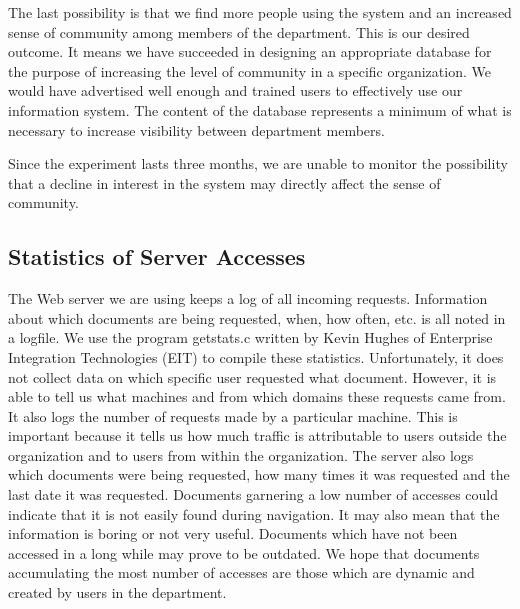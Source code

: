 The last possibility is that we find more people using the system and an
increased sense of community among members of the department.  This is our
desired outcome.  It means we have succeeded in designing an appropriate
database for the purpose of increasing the level of community in a specific
organization.  We would have advertised well enough and trained users to
effectively use our information system.  The content of the database
represents a minimum of what is necessary to increase visibility between
department members.

Since the experiment lasts three months, we are unable to monitor the
possibility that a decline in interest in the system may directly affect
the sense of community.


\subsection{Statistics of Server Accesses}

The Web server we are using keeps a log of all incoming requests.
Information about which documents are being requested, when, how often,
etc. is all noted in a logfile.  We use the program getstats.c written by
Kevin Hughes of Enterprise Integration Technologies (EIT) to compile these
statistics.  Unfortunately, it does not collect data on which specific user
requested what document.  However, it is able to tell us what machines and
from which domains these requests came from.  It also logs the number of
requests made by a particular machine.  This is important because it tells
us how much traffic is attributable to users outside the organization and
to users from within the organization.  The server also logs which
documents were being requested, how many times it was requested and the
last date it was requested.  Documents garnering a low number of accesses
could indicate that it is not easily found during navigation.  It may also
mean that the information is boring or not very useful.  Documents which
have not been accessed in a long while may prove to be outdated.  We hope
that documents accumulating the most number of accesses are those which are
dynamic and created by users in the department.

